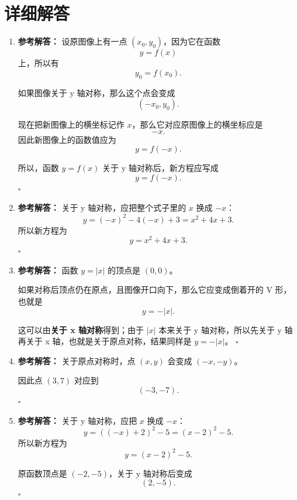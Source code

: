 \documentclass[11pt,a4paper,fontset=fandol]{ctexart}
\newenvironment{solution}{\par\noindent\textbf{参考解答：}}{\hfill$\square$\par}
\begin{document}
\newpage
\section{详细解答}

\begin{enumerate}
  \item \begin{solution}
  设原图像上有一点 $(x_0,y_0)$，因为它在函数
  \[
  y=f(x)
  \]
  上，所以有
  \[
  y_0=f(x_0).
  \]

  如果图像关于 y 轴对称，那么这个点会变成
  \[
  (-x_0,y_0).
  \]

  现在把新图像上的横坐标记作 $x$，那么它对应原图像上的横坐标应是
  \[
  -x.
  \]
  因此新图像上的函数值应为
  \[
  y=f(-x).
  \]

  所以，函数 $y=f(x)$ 关于 y 轴对称后，新方程应写成
  \[
  \boxed{y=f(-x)}.
  \]
  \end{solution}

  \item \begin{solution}
  关于 y 轴对称，应把整个式子里的 $x$ 换成 $-x$：
  \[
  y=(-x)^2-4(-x)+3=x^2+4x+3.
  \]
  所以新方程为
  \[
  \boxed{y=x^2+4x+3}.
  \]
  \end{solution}

  \item \begin{solution}
  函数 $y=|x|$ 的顶点是 $(0,0)$。

  如果对称后顶点仍在原点，且图像开口向下，那么它应变成倒着开的 V 形，也就是
  \[
  \boxed{y=-|x|}.
  \]

  这可以由\textbf{关于 x 轴对称}得到；由于 $|x|$ 本来关于 y 轴对称，所以先关于 y 轴再关于 x 轴，也就是关于原点对称，结果同样是 $y=-|x|$。
  \end{solution}

  \item \begin{solution}
  关于原点对称时，点 $(x,y)$ 会变成 $(-x,-y)$。

  因此点 $(3,7)$ 对应到
  \[
  \boxed{(-3,-7)}.
  \]
  \end{solution}

  \item \begin{solution}
  关于 y 轴对称，应把 $x$ 换成 $-x$：
  \[
  y=((-x)+2)^2-5=(x-2)^2-5.
  \]
  所以新方程为
  \[
  \boxed{y=(x-2)^2-5}.
  \]

  原函数顶点是 $(-2,-5)$，关于 y 轴对称后变成
  \[
  \boxed{(2,-5)}.
  \]
  \end{solution}


\end{enumerate}
\end{document}
